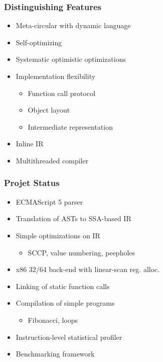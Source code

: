 \begin{frame}
\frametitle{\bf Distinguishing Features}
    \begin{itemize}
        \item Meta-circular with dynamic language
        \item Self-optimizing
        \item Systematic optimistic optimizations
        \item Implementation flexibility
        \begin{itemize}
            \item Function call protocol
            \item Object layout
            \item Intermediate representation
        \end{itemize}
        \item Inline IR
        \item Multithreaded compiler
    \end{itemize}
\end{frame}

\begin{frame}
\frametitle{\bf Projet Status}
    \begin{itemize}
        \item ECMAScript 5 parser
        \item Translation of ASTs to SSA-based IR
        \item Simple optimizations on IR
        \begin{itemize}
            \item SCCP, value numbering, peepholes
        \end{itemize}
        \item x86 32/64 back-end with linear-scan reg. alloc.
        \item Linking of static function calls
        \item Compilation of simple programs
        \begin{itemize}
            \item Fibonacci, loops
        \end{itemize}
        \item Instruction-level statistical profiler
        \item Benchmarking framework
    \end{itemize}
\end{frame}

